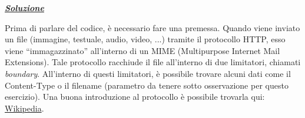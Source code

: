 \documentclass[a4paper]{article}
\newcommand{\dquotes}[1]{``#1''}
\begin{document}
	\noindent
	\textcolor{Green4}{\underline{\textbf{\emph{Soluzione}}}}\newline
	
	\noindent
	Prima di parlare del codice, è necessario fare una premessa. Quando viene inviato un file (immagine, testuale, audio, video, ...) tramite il protocollo HTTP, esso viene \dquotes{immagazzinato} all'interno di un MIME (Multipurpose Internet Mail Extensions). Tale protocollo racchiude il file all'interno di due limitatori, chiamati \emph{boundary}. All'interno di questi limitatori, è possibile trovare alcuni dati come il Content-Type o il filename (parametro da tenere sotto osservazione per questo esercizio). Una buona introduzione al protocollo è possibile trovarla qui: \href{https://en.wikipedia.org/wiki/MIME}{Wikipedia}.\newline
	
\end{document}
